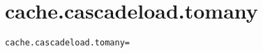 \section{cache.cascadeload.tomany}
\label{configuration:CacheCascadeloadTomany}
\ClearAPI
\TODO
{}
\begin{lstlisting}[style=Props,caption={Usage example for \textit{cache.cascadeload.tomany}}]
cache.cascadeload.tomany=
\end{lstlisting}